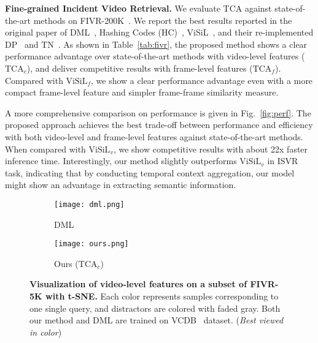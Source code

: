\documentclass[10pt,twocolumn,letterpaper]{article}
\begin{document}
\noindent\textbf{Fine-grained Incident Video Retrieval.} \label{paragraph:fivr}
We evaluate TCA against state-of-the-art methods on FIVR-200K~\cite{kordopatis2019fivr}. We report the best results reported in the original paper of DML~\cite{kordopatis2017dml}, Hashing Codes (HC)~\cite{song2013effective}, ViSiL~\cite{kordopatis2019visil}, and their re-implemented DP~\cite{chou2015pattern} and TN~\cite{tan2009scalable}. As shown in Table~\ref{tab:fivr}, the proposed method shows a clear performance advantage over state-of-the-art methods with video-level features ($\text{TCA}_{c}$), and deliver competitive results with frame-level features ($\text{TCA}_{f}$).
Compared with $\text{ViSiL}_{f}$, we show a clear performance advantage even with a more compact frame-level feature and simpler frame-frame similarity measure.

A more comprehensive comparison on performance is given in Fig.~\ref{fig:perf}. The proposed approach achieves the best trade-off between performance and efficiency with both video-level and frame-level features against state-of-the-art methods.
When compared with $\text{ViSiL}_{v}$, we show competitive results with about 22x faster inference time. Interestingly, our method slightly outperforms $\text{ViSiL}_{v}$ in ISVR task, indicating that by conducting temporal context aggregation, our model might show an advantage in extracting semantic information.

\begin{figure}[htb]
\begin{subfigure}{.49\textwidth}
  \centering
\texttt{[image: dml.png]}  
  \caption{DML~\cite{kordopatis2017dml}}
  \label{fig:dml}
\end{subfigure}
\begin{subfigure}{.49\textwidth}
  \centering
\texttt{[image: ours.png]}  
  \caption{Ours ($\text{TCA}_{c}$)}
  \label{fig:ours}
\end{subfigure}
\caption{\textbf{Visualization of video-level features on a subset of FIVR-5K with t-SNE.} Each color represents samples corresponding to one single query, and distractors are colored with faded gray. Both our method and DML are trained on VCDB~\cite{jiang2014vcdb} dataset. (\textit{Best viewed in color})}
\label{fig:tsne}
\end{figure}
\end{document}
